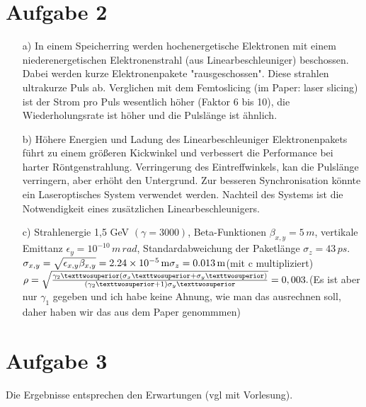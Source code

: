 \documentclass[11pt,a4paper]{article}
\begin{document}
    \section*{Aufgabe 2}
	\begin{itemize}
		\item[a)] 
			In einem Speicherring werden hochenergetische Elektronen mit einem niederenergetischen Elektronenstrahl (aus Linearbeschleuniger) beschossen.
			Dabei werden kurze Elektronenpakete "rausgeschossen".
			Diese strahlen ultrakurze Puls ab.
			Verglichen mit dem Femtoslicing (im Paper: laser slicing) ist der Strom pro Puls wesentlich höher (Faktor 6 bis 10),
			die Wiederholungsrate ist höher und die Pulslänge ist ähnlich.
			
		\item[b)]
			Höhere Energien und Ladung des Linearbeschleuniger Elektronenpakets führt zu einem größeren Kickwinkel 
			und verbessert die Performance bei harter Röntgenstrahlung.
			Verringerung des Eintreffwinkels, kan die Pulslänge verringern, aber erhöht den Untergrund.
			Zur besseren Synchronisation könnte ein Laseroptisches System verwendet werden.
			Nachteil des Systems ist die Notwendigkeit eines zusätzlichen Linearbeschleunigers.

		\item[c)]
			Strahlenergie 1,5 GeV $(\gamma  = 3000)$, Beta-Funktionen $\beta_{x,y}
			= 5\,m$, vertikale Emittanz $\epsilon_y = 10^{-10}\,m\,rad$, Standardabweichung der Paketlänge $\sigma_z = 43\,ps$. \\
			$\sigma_{x,y} = \sqrt{\epsilon_{x,y} \beta_ {x,y}} = \SI{2.24e-5}{\meter}\\
			\sigma_{z} = \SI{0.013}{\meter} $(mit c multipliziert)$\\
			\rho = \sqrt{\frac{\gamma_2 ² (\sigma_x² + \sigma_y²)}{(\gamma_2²+1)\sigma_y²}} = 0,003.\\
			$(Es ist aber nur $\gamma_{1}$ gegeben und ich habe keine Ahnung, wie man das ausrechnen soll, daher haben wir das aus dem Paper genommmen)
	\end{itemize}

	\section*{Aufgabe 3}
		Die Ergebnisse entsprechen den Erwartungen (vgl mit Vorlesung).
\end{document}

